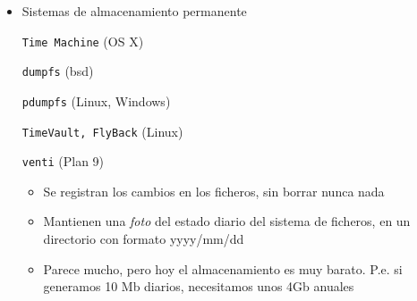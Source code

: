 \documentclass[ucs]{beamer}
\begin{document}
\begin{frame}[fragile]
\begin{itemize}


\item 
Sistemas de almacenamiento permanente

\verb|Time Machine| (OS X)

\verb|dumpfs| (bsd) 

\verb|pdumpfs| (Linux, Windows)

\verb|TimeVault, FlyBack| (Linux)

\verb|venti| (Plan 9)

\begin{itemize}
\item 
Se registran los cambios en los ficheros, sin borrar nunca nada
\item 
Mantienen una 
\emph{foto} del estado diario del sistema de ficheros, en
un directorio con formato yyyy/mm/dd 
\item 
Parece mucho, pero hoy el almacenamiento es muy barato. P.e. si 
generamos 10 Mb diarios, necesitamos unos 4Gb
anuales
\end{itemize}
\end{itemize}


\end{frame}




\end{document}
